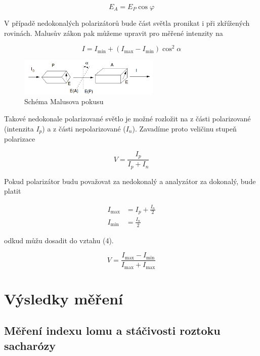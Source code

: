 \documentclass[a4paper,11pt]{article}
\begin{document}
\begin{equation}
E_A = E_P \cos \varphi
\end{equation}

\noindent
V případě nedokonalých polarizátorů bude část světla pronikat i při zkřížených rovinách. Malusův zákon pak můžeme upravit pro měřené intenzity na

\begin{equation}
I = I_{\text{min}} + (I_{\text{max}} - I_{\text{min}}) \cos^2 \alpha
\end{equation}

\begin{figure}[htpb]
    \centering
    \includegraphics[width=0.6\textwidth]{malus_schema.jpg}
    \caption{Schéma Malusova pokusu}    
\end{figure}

Takové nedokonale polarizované světlo je možné rozložit na z části polarizované (intenzita $ I_p $) a z části nepolarizované ($ I_n $). Zavadíme proto veličinu stupeň polarizace

\begin{equation}
V = \frac{I_p}{I_p + I_n}
\end{equation}

\noindent
Pokud polarizátor budu považovat za nedokonalý a analyzátor za dokonalý, bude platit

\begin{align}
    I_{\text{max}} &= I_p + \frac{I_n}{2} \\
    I_{\text{min}} &= \frac{I_n}{2}
\end{align}

\noindent
odkud můžu dosadit do vztahu (4).

\begin{equation}
V = \frac{I_{\text{max}} - I_{\text{min}}}{I_{\text{max}} + I_{\text{max}}}
\end{equation}

\newpage

\section{Výsledky měření}

\subsection{Měření indexu lomu a stáčivosti roztoku sacharózy}
\end{document}
